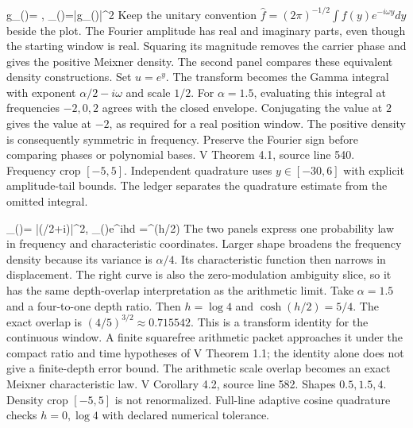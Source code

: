 {\widehat g_\alpha(\omega)=
 {\sqrt{2\pi\Gamma(\alpha)}},\qquad
 \rho_\alpha(\omega)=|\widehat g_\alpha(\omega)|^2}
{Keep the unitary convention
$\widehat f=(2\pi)^{-1/2}\int f(y)e^{-i\omega y}dy$ beside the plot.
The Fourier amplitude has real and imaginary parts, even though the starting
window is real. Squaring its magnitude removes the carrier phase and gives
the positive Meixner density. The second panel compares these equivalent
density constructions.}
{Set $u=e^y$. The transform becomes the Gamma integral with exponent
$\alpha/2-i\omega$ and scale $1/2$. For $\alpha=1.5$, evaluating this
integral at frequencies $-2,0,2$ agrees with the closed envelope. Conjugating
the value at $2$ gives the value at $-2$, as required for a real position
window. The positive density is consequently symmetric in frequency.}
{Preserve the Fourier sign before comparing phases or polynomial bases.}
{V Theorem 4.1, source line 540. Frequency crop $[-5,5]$. Independent
quadrature uses $y\in[-30,6]$ with explicit amplitude-tail bounds. The
ledger separates the quadrature estimate from the omitted integral.}

{\rho_\alpha(\omega)=
 |\Gamma(\alpha/2+i\omega)|^2,\qquad
 \int\rho_\alpha(\omega)e^{ih\omega}d\omega
 =^{\alpha}(h/2)}
{The two panels express one probability law in frequency and characteristic
coordinates. Larger shape broadens the frequency density because its variance
is $\alpha/4$. Its characteristic function then narrows in displacement.
The right curve is also the zero-modulation ambiguity slice, so it has the
same depth-overlap interpretation as the arithmetic limit.}
{Take $\alpha=1.5$ and a four-to-one depth ratio. Then $h=\log4$ and
$\cosh(h/2)=5/4$. The exact overlap is
$(4/5)^{3/2}\approx0.715542$. This is a transform identity for the
continuous window. A finite squarefree arithmetic packet approaches it under
the compact ratio and time hypotheses of V Theorem 1.1; the identity alone
does not give a finite-depth error bound.}
{The arithmetic scale overlap becomes an exact Meixner characteristic law.}
{V Corollary 4.2, source line 582. Shapes $0.5,1.5,4$. Density crop
$[-5,5]$ is not renormalized. Full-line adaptive cosine quadrature checks
$h=0,\log4$ with declared numerical tolerance.}

